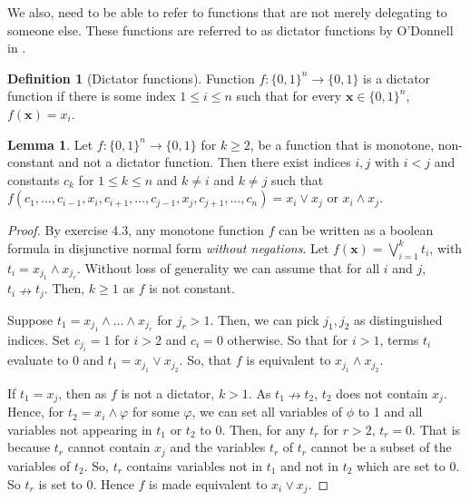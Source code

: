 \documentclass[11pt,a4paper, titlepage]{article}
\theoremstyle{definition}
\newtheorem{definition}[theorem]{Definition}
\newtheorem{lemma}[theorem]{Lemma}
\let\vec\mathbf
\begin{document}
We also, need to be able to refer to functions that are not merely delegating to someone else. 
These functions are referred to as dictator functions by O'Donnell in \cite{boolean}.

\begin{definition}[Dictator functions]
    Function $f \colon \{0, 1\}^n \longrightarrow \{0, 1\}$ is a dictator function if there is some index $1 \leq i \leq n$ such that for every $\vec{x} \in \{0, 1\}^n$, $f(\vec{x}) = x_i$.
\end{definition}

\begin{lemma}
    \label{lem:boolean}
    Let $f \colon \{0,1\}^n \longrightarrow \{0,1\}$ for $k \geq 2$, be a function that is monotone, non-constant and not a dictator function.
    Then there exist indices $i, j$ with $i < j$ and constants $c_k$ for $1 \leq k \leq n$ and $k \neq i$ and $k \neq j$ such that $f(c_1, \ldots, c_{i-1}, x_i, c_{i+1}, \ldots, c_{j-1}, x_j, c_{j+1}, \ldots, c_n) = x_i \lor x_j$ or $x_i \land x_j$.
\end{lemma}

\begin{proof}
    By \cite{boolean} exercise 4.3, any monotone function $f$ can be written as a boolean formula in disjunctive normal form \emph{without negations}.
    Let $f(\vec{x}) = \bigvee_{i = 1}^k t_i$, with $t_i = x_{j_1} \land x_{j_r}$.
    Without loss of generality we can assume that for all $i$ and $j$, $t_i \nrightarrow t_j$.
    Then, $k \geq 1$ as $f$ is not constant.
    
    Suppose $t_1 = x_{j_1} \land \ldots \land x_{j_r}$ for $j_r > 1$. 
    Then, we can pick $j_1, j_2$ as distinguished indices. Set $c_{j_i} = 1$ for $i > 2$ and $c_i = 0$ otherwise.
    So that for $i > 1$, terms $t_i$ evaluate to $0$ and $t_1 =x_{j_1} \lor x_{j_2}$.
    So, that $f$ is equivalent to $x_{j_1} \land x_{j_2}$.
    
    If $t_1 = x_j$, then as $f$ is not a dictator, $k > 1$.
    As $t_1 \nrightarrow t_2$, $t_2$ does not contain $x_j$.
    Hence, for $t_2 = x_i \land \varphi$ for some $\varphi$, we can set all variables of $\phi$ to 1 and all variables not appearing in $t_1$ or $t_2$ to 0.
    Then, for any $t_r$ for $r > 2$, $t_r = 0$. That is because $t_r$ cannot contain $x_j$ and the variables $t_r$ of $t_r$ cannot be a subset of the variables of $t_2$.
    So, $t_r$ contains variables not in $t_1$ and not in $t_2$ which are set to $0$. So $t_r$ is set to 0.
    Hence $f$ is made equivalent to $x_i \lor x_j$.
\end{proof}
\end{document}
